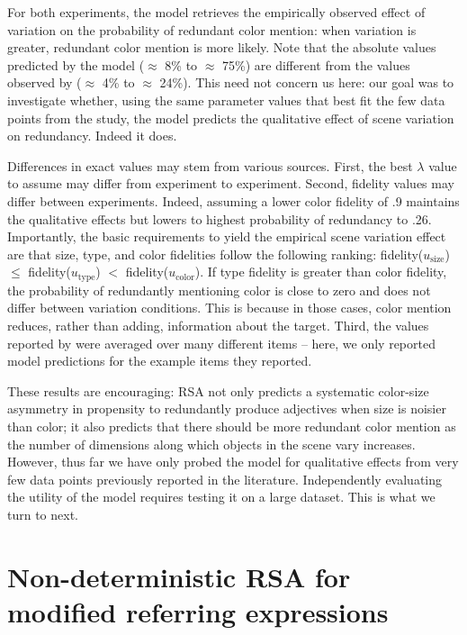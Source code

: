\documentclass[11pt]{article}
\begin{document}
For both experiments, the model retrieves the empirically observed effect of variation on the probability of redundant color mention: when variation is greater, redundant color mention is more likely. Note that the absolute values predicted by the model ($\approx$ 8\% to $\approx$ 75\%) are different from the values observed by   ($\approx$ 4\% to $\approx$ 24\%). This need not concern us here: our goal was to investigate whether, using the same parameter values that best fit the few data points from the  study, the model predicts the qualitative effect of scene variation on redundancy. Indeed it does. 

Differences in exact values may stem from various sources. First, the best $\lambda$ value to assume may differ from experiment to experiment. Second, fidelity values may differ between experiments. Indeed, assuming a lower color fidelity of .9 maintains the qualitative effects but lowers to highest probability of redundancy to .26. Importantly, the basic requirements to yield the empirical scene variation effect are that size, type, and color fidelities follow the following ranking: fidelity($u_{\textrm{size}}$) $\leq$ fidelity($u_{\textrm{type}}$) $<$ fidelity($u_{\textrm{color}}$). If type fidelity is greater than color fidelity, the probability of redundantly mentioning color is close to zero and does not differ between variation conditions. This is because in those cases, color mention reduces, rather than adding, information about the target. Third, the values reported by  were averaged over many different items -- here, we only reported model predictions for the example items they reported.

These results are encouraging: RSA not only predicts a systematic color-size asymmetry in propensity to redundantly produce adjectives when size is noisier than color; it also predicts that there should be more redundant color mention as the number of dimensions along which objects in the scene vary increases. However, thus far we have only probed the model for qualitative effects from very few data points previously reported in the literature. Independently evaluating the utility of the model requires  testing it on a large dataset. This is what we turn to next.

\section{Non-deterministic RSA for modified referring expressions}
\label{sec:rsaevaluationbasicscene}
\end{document}
